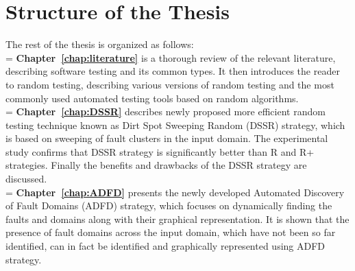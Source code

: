 %

\section{Structure of the Thesis}
The rest of the thesis is organized as follows:\\

\hangindent=\parindent
{}
\noindent
\textbf{Chapter~\ref{chap:literature}} is a thorough review of the relevant literature, describing software testing and its common types. It then introduces the reader to random testing, describing various versions of random testing and the most commonly used automated testing tools based on random algorithms. \\


\hangindent=\parindent
{}
\noindent
\textbf{Chapter~\ref{chap:DSSR}} describes newly proposed more efficient random testing technique known as Dirt Spot Sweeping Random (DSSR) strategy, which is based on sweeping of fault clusters in the input domain. The experimental study confirms that DSSR strategy is significantly better than R and R+ strategies. Finally the benefits and drawbacks of the DSSR strategy are discussed.\\

\hangindent=\parindent
{}
\noindent
\textbf{Chapter~\ref{chap:ADFD}} presents the newly developed Automated Discovery of Fault Domains  (ADFD) strategy, which focuses on dynamically finding the faults and domains along with their graphical representation. It is shown that the presence of fault domains across the input domain, which have not been so far identified, can in fact be identified and graphically represented using 
ADFD strategy.\\

